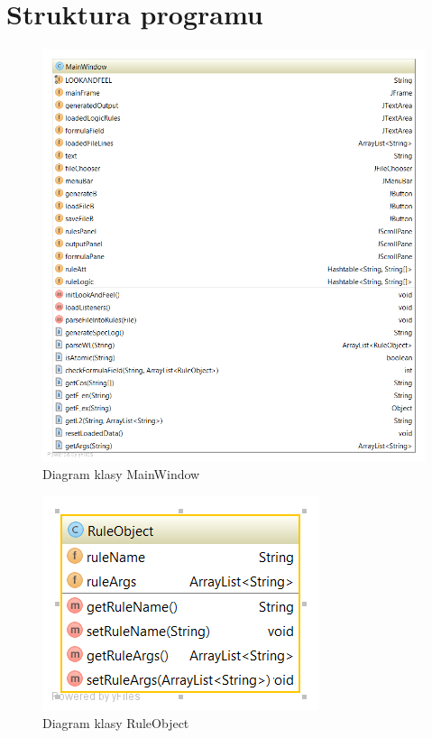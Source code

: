 \documentclass[a4paper, 11pt]{article}
\begin{document}
	\section{Struktura programu}
	\begin{figure}[H]
		\centerline{\includegraphics[scale=0.6]{diagram}}
		\caption{Diagram klasy MainWindow}

	\end{figure}%
	\begin{figure}[H]
		\centerline{\includegraphics[scale=0.6]{diagram2}}
		\caption{Diagram klasy RuleObject}

	\end{figure}%
\end{document}
